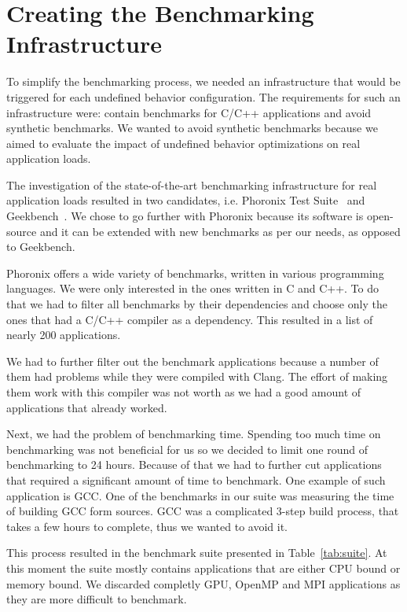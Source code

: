 \section{Creating the Benchmarking Infrastructure} \label{sec:benchmarks}

To simplify the benchmarking process, we needed an infrastructure that would be
triggered for each undefined behavior configuration. The requirements for such
an infrastructure were: contain benchmarks for C/C++ applications and avoid
synthetic benchmarks. We wanted to avoid synthetic benchmarks because we aimed
to evaluate the impact of undefined behavior optimizations on real application
loads.

The investigation of the state-of-the-art benchmarking infrastructure for real
application loads resulted in two candidates, i.e. Phoronix Test
Suite~\cite{phoronix} and Geekbench~\cite{geekbench}. We chose to go further
with Phoronix because its software is open-source and it can be extended with
new benchmarks as per our needs, as opposed to Geekbench.

Phoronix offers a wide variety of benchmarks, written in various programming
languages. We were only interested in the ones written in C and C++. To do that
we had to filter all benchmarks by their dependencies and choose only the ones
that had a C/C++ compiler as a dependency. This resulted in a list of nearly 200
applications.

We had to further filter out the benchmark applications because a number of them
had problems while they were compiled with Clang. The effort of making them work
with this compiler was not worth as we had a good amount of applications that
already worked.

Next, we had the problem of benchmarking time. Spending too much time on
benchmarking was not beneficial for us so we decided to limit one round of
benchmarking to 24 hours. Because of that we had to further cut applications
that required a significant amount of time to benchmark. One example of such
application is GCC. One of the benchmarks in our suite was measuring the time of
building GCC form sources. GCC was a complicated 3-step build process, that
takes a few hours to complete, thus we wanted to avoid it.

This process resulted in the benchmark suite presented in Table~\ref{tab:suite}.
At this moment the suite mostly  contains applications that are either CPU bound
or memory bound. We discarded completly GPU, OpenMP and MPI applications as they
are more difficult to benchmark.
